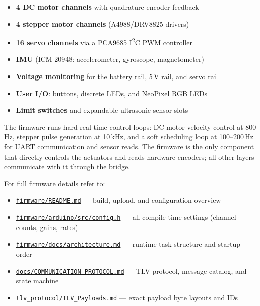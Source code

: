 \documentclass{ol-softwaremanual}
\newcommand{\doclink}[2]{\href{#1}{#2}}
\begin{document}
\begin{itemize}
  \item \textbf{4 DC motor channels} with quadrature encoder feedback
  \item \textbf{4 stepper motor channels} (A4988/DRV8825 drivers)
  \item \textbf{16 servo channels} via a PCA9685 I\textsuperscript{2}C PWM controller
  \item \textbf{IMU} (ICM-20948: accelerometer, gyroscope, magnetometer)
  \item \textbf{Voltage monitoring} for the battery rail, 5\,V rail, and servo rail
  \item \textbf{User I/O}: buttons, discrete LEDs, and NeoPixel RGB LEDs
  \item \textbf{Limit switches} and expandable ultrasonic sensor slots
\end{itemize}

The firmware runs hard real-time control loops: DC motor velocity control at 800\,Hz,
stepper pulse generation at 10\,kHz, and a soft scheduling loop at 100--200\,Hz for
UART communication and sensor reads.
The firmware is the only component that directly controls the actuators and reads
hardware encoders; all other layers communicate with it through the bridge.

For full firmware details refer to:
\begin{itemize}
  \item \doclink{https://github.com/pochihh/Project-NUEVO/blob/main/firmware/README.md}{\texttt{firmware/README.md}} --- build, upload, and configuration overview
  \item \doclink{https://github.com/pochihh/Project-NUEVO/blob/main/firmware/arduino/src/config.h}{\texttt{firmware/arduino/src/config.h}} --- all compile-time settings (channel counts, gains, rates)
  \item \doclink{https://github.com/pochihh/Project-NUEVO/blob/main/firmware/docs/architecture.md}{\texttt{firmware/docs/architecture.md}} --- runtime task structure and startup order
  \item \doclink{https://github.com/pochihh/Project-NUEVO/blob/main/docs/COMMUNICATION_PROTOCOL.md}{\texttt{docs/COMMUNICATION\_PROTOCOL.md}} --- TLV protocol, message catalog, and state machine
  \item \doclink{https://github.com/pochihh/Project-NUEVO/blob/main/tlv_protocol/TLV_Payloads.md}{\texttt{tlv\_protocol/TLV\_Payloads.md}} --- exact payload byte layouts and IDs
\end{itemize}
\end{document}
